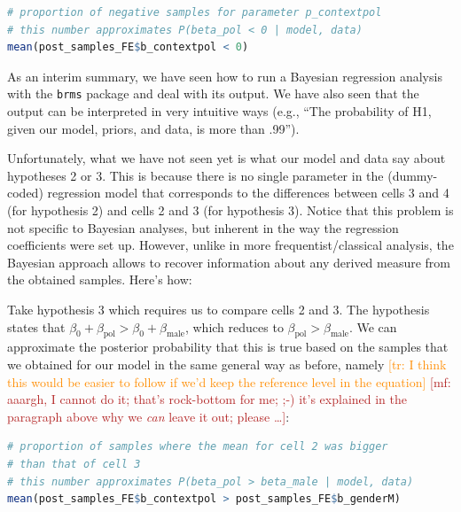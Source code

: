 \documentclass[nobib]{tufte-handout}
\renewcommand{\mf}[1]{\textcolor{firebrick}{[mf: #1]}}
\newcommand{\tr}[1]{\textcolor{DarkOrange}{[tr: #1]}}
\begin{document}
\begin{minipage}[]{\textwidth}
\begin{lstlisting}[language=R]
# proportion of negative samples for parameter p_contextpol
# this number approximates P(beta_pol < 0 | model, data)
mean(post_samples_FE$b_contextpol < 0)
\end{lstlisting}
\end{minipage}

As an interim summary, we have seen how to run a Bayesian regression analysis with the \texttt{brms} package and deal with its output. We have also seen that the output can be interpreted in very intuitive ways (e.g., ``The probability of H1, given our model, priors, and data, is more than .99'').

Unfortunately, what we have not seen yet is what our model and data say about hypotheses 2 or 3. This is because there is no single parameter in the (dummy-coded) regression model that corresponds to the differences between cells 3 and 4 (for hypothesis 2) and cells 2 and 3 (for hypothesis 3). Notice that this problem is not specific to Bayesian analyses, but inherent in the way the regression coefficients were set up.
%
%
However, unlike in more frequentist/classical analysis, the Bayesian approach allows to recover information about any derived measure from the obtained samples. Here's how:

Take hypothesis 3 which requires us to compare cells 2 and 3. The hypothesis states that
$\beta_0 + \beta_{\text{pol}} > \beta_0 + \beta_{\text{male}}$, which reduces to
$\beta_{\text{pol}} > \beta_{\text{male}}$. We can approximate the posterior probability that
this is true based on the samples that we obtained for our model in the same general way as
before, namely \tr{I think this would be easier to follow if we'd keep the reference level in
  the equation} \mf{aaargh, I cannot do it; that's rock-bottom for me; ;-) it's explained in
  the paragraph above why we \emph{can} leave it out; please \dots}:

\begin{minipage}[]{1.1\textwidth}
\begin{lstlisting}[language=R]
# proportion of samples where the mean for cell 2 was bigger 
# than that of cell 3 
# this number approximates P(beta_pol > beta_male | model, data)
mean(post_samples_FE$b_contextpol > post_samples_FE$b_genderM)
\end{lstlisting}
\end{minipage}
\end{document}
